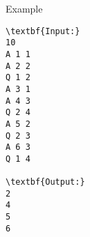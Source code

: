 Example
\begin{verbatim}
\textbf{Input:}
10
A 1 1
A 2 2
Q 1 2
A 3 1
A 4 3
Q 2 4
A 5 2
Q 2 3
A 6 3
Q 1 4

\textbf{Output:}
2
4
5
6
\end{verbatim}